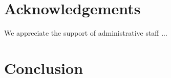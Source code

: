 \section{Acknowledgements}

We appreciate the support of administrative staff ...

\section{Conclusion}



